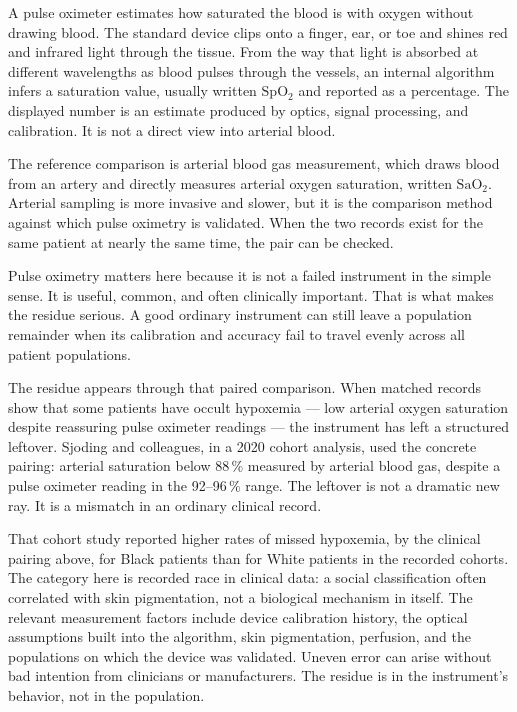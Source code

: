 A pulse oximeter estimates how saturated the blood is with oxygen without
drawing blood. The standard device clips onto a finger, ear, or toe and
shines red and infrared light through the tissue. From the way that light is
absorbed at different wavelengths as blood pulses through the vessels, an
internal algorithm infers a saturation value, usually written
\(\mathrm{SpO_2}\) and reported as a percentage. The displayed number is an
estimate produced by optics, signal processing, and calibration. It is not a
direct view into arterial blood.

The reference comparison is arterial blood gas measurement, which draws
blood from an artery and directly measures arterial oxygen saturation,
written \(\mathrm{SaO_2}\). Arterial sampling is more invasive and slower,
but it is the comparison method against which pulse oximetry is validated.
When the two records exist for the same patient at nearly the same time,
the pair can be checked.

Pulse oximetry matters here because it is not a failed instrument in the
simple sense. It is useful, common, and often clinically important. That is
what makes the residue serious. A good ordinary instrument can still leave a
population remainder when its calibration and accuracy fail to travel evenly
across all patient populations.

The residue appears through that paired comparison. When matched records
show that some patients have occult hypoxemia --- low arterial oxygen
saturation despite reassuring pulse oximeter readings --- the instrument
has left a structured leftover. Sjoding and colleagues, in a 2020 cohort
analysis, used the concrete pairing: arterial saturation below
88\,\% measured by arterial blood gas, despite a pulse oximeter reading in
the 92--96\,\% range. The leftover is not a dramatic new ray. It is a
mismatch in an ordinary clinical record.

That cohort study reported higher rates of missed hypoxemia, by the
clinical pairing above, for Black patients than for White patients in the
recorded cohorts. The category here is recorded race in clinical data: a social classification
often correlated with skin pigmentation, not a biological mechanism in
itself. The relevant measurement factors
include device calibration history, the optical assumptions built into the
algorithm, skin pigmentation, perfusion, and the populations on which the
device was validated. Uneven error can arise without bad intention from clinicians or
manufacturers. The residue is in the
instrument's behavior, not in the population.

